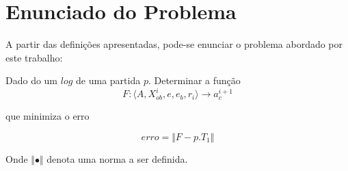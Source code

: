 \section{Enunciado do Problema}

A partir das definições apresentadas, pode-se enunciar o problema 
abordado por este trabalho:

Dado do um $log$ de uma partida $p$. Determinar a função
\[
F:\langle A, X_{ob}^{i}, e, e_b, r_i \rangle \longrightarrow a_c^{i+1}
\]

que minimiza o erro

\[
 erro = \Vert F - p.T_1 \Vert
\]

Onde $\Vert \bullet \Vert$ denota uma norma a ser definida.
